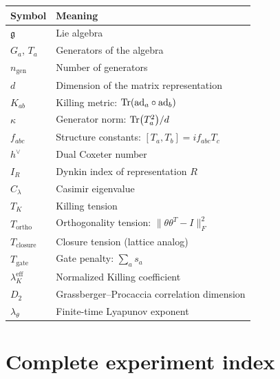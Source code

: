 \documentclass[11pt,a4paper]{article}
\newcommand{\fkg}{\mathfrak{g}}
\newcommand{\TK}{T_K}
\newcommand{\Tortho}{T_{\mathrm{ortho}}}
\newcommand{\Tclosure}{T_{\mathrm{closure}}}
\newcommand{\Tgate}{T_{\mathrm{gate}}}
\newcommand{\ngen}{n_{\mathrm{gen}}}
\newcommand{\hdual}{h^{\vee}}
\theoremstyle{definition}
\begin{document}
\begin{table}[H]
\centering
\begin{tabular}{ll}
\toprule
Symbol & Meaning \\
\midrule
$\fkg$ & Lie algebra \\
$G_a$, $T_a$ & Generators of the algebra \\
$\ngen$ & Number of generators \\
$d$ & Dimension of the matrix representation \\
$K_{ab}$ & Killing metric: $\Tr(\mathrm{ad}_a \circ \mathrm{ad}_b)$ \\
$\kappa$ & Generator norm: $\Tr(T_a^2)/d$ \\
$f_{abc}$ & Structure constants: $[T_a, T_b] = i f_{abc} T_c$ \\
$\hdual$ & Dual Coxeter number \\
$I_R$ & Dynkin index of representation $R$ \\
$C_\lambda$ & Casimir eigenvalue \\
$\TK$ & Killing tension \\
$\Tortho$ & Orthogonality tension: $\|\theta\theta^T - I\|_F^2$ \\
$\Tclosure$ & Closure tension (lattice analog) \\
$\Tgate$ & Gate penalty: $\sum_a s_a$ \\
$\lambda_K^{\mathrm{eff}}$ & Normalized Killing coefficient \\
$D_2$ & Grassberger--Procaccia correlation dimension \\
$\lambda_\theta$ & Finite-time Lyapunov exponent \\
\bottomrule
\end{tabular}
\end{table}


\section{Complete experiment index}
\label{app:experiments}
\end{document}
